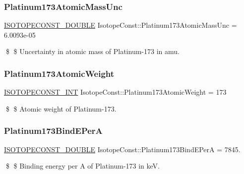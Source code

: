 \subsubsection{\texorpdfstring{Platinum173\+Atomic\+Mass\+Unc}{Platinum173AtomicMassUnc}}
{\footnotesize\ttfamily \mbox{\hyperlink{group___isotope_const-_macros_ga8f45a7272ce02c0b4c65c44636ed719a}{I\+S\+O\+T\+O\+P\+E\+C\+O\+N\+S\+T\+\_\+\+D\+O\+U\+B\+LE}} Isotope\+Const\+::\+Platinum173\+Atomic\+Mass\+Unc = 6.\+0093e-\/05}

\$ \$ Uncertainty in atomic mass of Platinum-\/173 in amu. \mbox{\label{group___isotope_const-_platinum-_pt173_gaa03d9175172927e715d9537d2cde54cd}} 
\subsubsection{\texorpdfstring{Platinum173\+Atomic\+Weight}{Platinum173AtomicWeight}}
{\footnotesize\ttfamily \mbox{\hyperlink{group___isotope_const-_macros_ga5f18360b3e99483a35c32d789e62621c}{I\+S\+O\+T\+O\+P\+E\+C\+O\+N\+S\+T\+\_\+\+I\+NT}} Isotope\+Const\+::\+Platinum173\+Atomic\+Weight = 173}

\$ \$ Atomic weight of Platinum-\/173. \mbox{\label{group___isotope_const-_platinum-_pt173_gaada409562b5af7229d169cd976ec394c}} 
\subsubsection{\texorpdfstring{Platinum173\+Bind\+E\+PerA}{Platinum173BindEPerA}}
{\footnotesize\ttfamily \mbox{\hyperlink{group___isotope_const-_macros_ga8f45a7272ce02c0b4c65c44636ed719a}{I\+S\+O\+T\+O\+P\+E\+C\+O\+N\+S\+T\+\_\+\+D\+O\+U\+B\+LE}} Isotope\+Const\+::\+Platinum173\+Bind\+E\+PerA = 7845.}

\$ \$ Binding energy per A of Platinum-\/173 in keV. \mbox{\label{group___isotope_const-_platinum-_pt173_gaf91dbdb13db62c4cfc872aa434ca8196}} 
